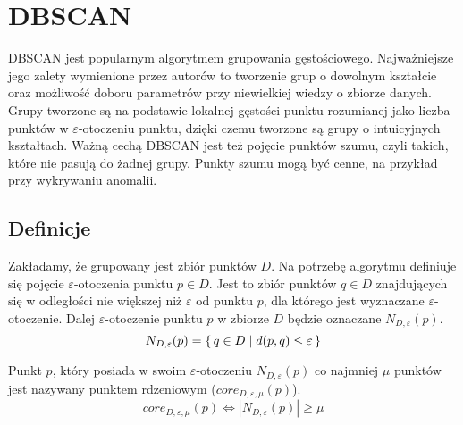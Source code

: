 \section{DBSCAN}
DBSCAN \cite{dbscan} jest popularnym algorytmem grupowania gęstościowego. Najważniejsze jego zalety wymienione przez autorów to tworzenie grup o dowolnym kształcie oraz możliwość doboru parametrów przy niewielkiej wiedzy o zbiorze danych. Grupy tworzone są na podstawie lokalnej gęstości punktu rozumianej jako liczba punktów w $ \varepsilon $-otoczeniu punktu, dzięki czemu tworzone są grupy o intuicyjnych kształtach. Ważną cechą DBSCAN jest też pojęcie punktów szumu, czyli takich, które nie pasują do żadnej grupy. Punkty szumu mogą być cenne, na przykład przy wykrywaniu anomalii.

\subsection{Definicje}

\newline
Zakładamy, że grupowany jest zbiór punktów $ D $. Na potrzebę algorytmu definiuje się pojęcie $ \varepsilon $-otoczenia punktu $ p \in D $. Jest to zbiór punktów $ q \in D $ znajdujących się w odległości nie większej niż $ \varepsilon $ od punktu $ p $, dla którego jest wyznaczane $\varepsilon$-otoczenie. Dalej $\varepsilon$-otoczenie punktu $ p $ w zbiorze $ D $ będzie oznaczane $ N_{D,\varepsilon}(p) $.
\begin{equation}\label{eq:eps-neighbourhood}
	N_{D,\varepsilon}(p) = \set{q \in D | d(p, q) \le \varepsilon}
\end{equation}

\newline
Punkt $ p $, który posiada w swoim $ \varepsilon $-otoczeniu $ N_{D,\varepsilon}(p) $ co najmniej $ \mu $ punktów jest nazywany punktem rdzeniowym ($ core_{D,\varepsilon,\mu}(p) $).
\begin{equation}\label{core-point}
	core_{D,\varepsilon,\mu}(p) \iff |N_{D,\varepsilon}(p)| \ge \mu
\end{equation}



